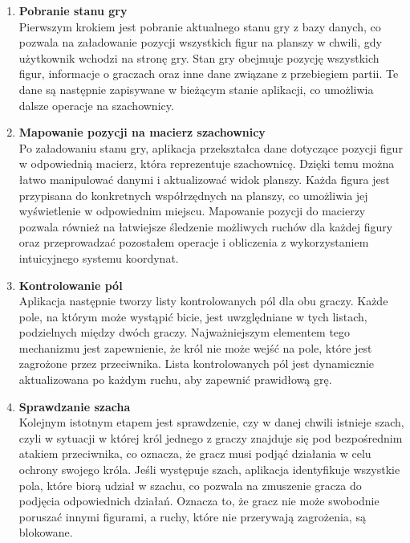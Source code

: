 \documentclass[twoside]{projektInzynierskiMS1}
\begin{document}
\begin{enumerate}
    \item \textbf{Pobranie stanu gry}\\
    Pierwszym krokiem jest pobranie aktualnego stanu gry z bazy danych, co pozwala na załadowanie pozycji wszystkich figur na planszy w chwili, gdy użytkownik wchodzi na stronę gry. Stan gry obejmuje pozycję wszystkich figur, informacje o graczach oraz inne dane związane z przebiegiem partii. Te dane są następnie zapisywane w bieżącym stanie aplikacji, co umożliwia dalsze operacje na szachownicy.

    \item \textbf{Mapowanie pozycji na macierz szachownicy}\\
    Po załadowaniu stanu gry, aplikacja przekształca dane dotyczące pozycji figur w odpowiednią macierz, która reprezentuje szachownicę. Dzięki temu można łatwo manipulować danymi i aktualizować widok planszy. Każda figura jest przypisana do konkretnych współrzędnych na planszy, co umożliwia jej wyświetlenie w odpowiednim miejscu. Mapowanie pozycji do macierzy pozwala również na łatwiejsze śledzenie możliwych ruchów dla każdej figury oraz przeprowadzać pozostałem operacje i obliczenia z wykorzystaniem intuicyjnego systemu koordynat.

\newpage

    \item \textbf{Kontrolowanie pól}\\
    Aplikacja następnie tworzy listy kontrolowanych pól dla obu graczy. Każde pole, na którym może wystąpić bicie, jest uwzględniane w tych listach, podzielnych między dwóch graczy. Najważniejszym elementem tego mechanizmu jest zapewnienie, że król nie może wejść na pole, które jest zagrożone przez przeciwnika. Lista kontrolowanych pól jest dynamicznie aktualizowana po każdym ruchu, aby zapewnić prawidłową grę.

    \item \textbf{Sprawdzanie szacha}\\
    Kolejnym istotnym etapem jest sprawdzenie, czy w danej chwili istnieje szach, czyli w sytuacji w której król jednego z graczy znajduje się pod bezpośrednim atakiem przeciwnika, co oznacza, że gracz musi podjąć działania w celu ochrony swojego króla. Jeśli występuje szach, aplikacja identyfikuje wszystkie pola, które biorą udział w szachu, co pozwala na zmuszenie gracza do podjęcia odpowiednich działań. Oznacza to, że gracz nie może swobodnie poruszać innymi figurami, a ruchy, które nie przerywają zagrożenia, są blokowane.


\end{enumerate}
\end{document}

